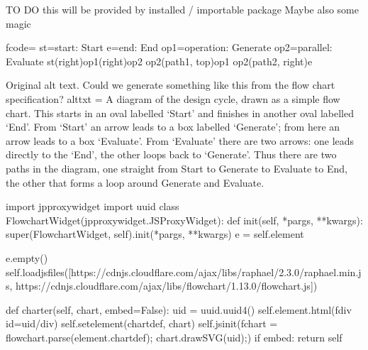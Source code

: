 \documentclass[letterpaper,10pt,english]{sphinxmanual}
\begin{document}
{{
\begin{sphinxVerbatim}[commandchars=\\\{\}]
\llap{\color{nbsphinxin}[ ]:\,\hspace{\fboxrule}\hspace{\fboxsep}}\PYGZsh{} TO DO \PYGZhy{} this will be provided by installed / importable package
\PYGZsh{} Maybe also some magic

fcode=\PYGZsq{}\PYGZsq{}\PYGZsq{}
st=\PYGZgt{}start: Start
e=\PYGZgt{}end: End
op1=\PYGZgt{}operation: Generate
op2=\PYGZgt{}parallel: Evaluate
st(right)\PYGZhy{}\PYGZgt{}op1(right)\PYGZhy{}\PYGZgt{}op2
op2(path1, top)\PYGZhy{}\PYGZgt{}op1
op2(path2, right)\PYGZhy{}\PYGZgt{}e
\PYGZsq{}\PYGZsq{}\PYGZsq{}

\PYGZsh{}Original alt text.
\PYGZsh{} Could we generate something like this from the flow chart specification?
alt\PYGZus{}txt = \PYGZdq{}\PYGZdq{}\PYGZdq{}
A diagram of the design cycle, drawn as a simple flow chart.
This starts in an oval labelled ‘Start’ and finishes in another oval labelled ‘End’.
From ‘Start’ an arrow leads to a box labelled ‘Generate’;
from here an arrow leads to a box ‘Evaluate’.
From ‘Evaluate’ there are two arrows:
one leads directly to the ‘End’, the other loops back to ‘Generate’.
Thus there are two paths in the diagram,
one straight from Start to Generate to Evaluate to End,
the other that forms a loop around Generate and Evaluate.\PYGZdq{}\PYGZdq{}\PYGZdq{}

import jp\PYGZus{}proxy\PYGZus{}widget
import uuid
class FlowchartWidget(jp\PYGZus{}proxy\PYGZus{}widget.JSProxyWidget):
    def \PYGZus{}\PYGZus{}init\PYGZus{}\PYGZus{}(self, *pargs, **kwargs):
        super(FlowchartWidget, self).\PYGZus{}\PYGZus{}init\PYGZus{}\PYGZus{}(*pargs, **kwargs)
        e = self.element

        e.empty()
        self.load\PYGZus{}js\PYGZus{}files([\PYGZdq{}https://cdnjs.cloudflare.com/ajax/libs/raphael/2.3.0/raphael.min.js\PYGZdq{},
                            \PYGZsq{}https://cdnjs.cloudflare.com/ajax/libs/flowchart/1.13.0/flowchart.js\PYGZsq{}])

    def charter(self, chart, embed=False):
        uid = uuid.uuid4()
        self.element.html(f\PYGZsq{}\PYGZlt{}div id=\PYGZdq{}\PYGZob{}uid\PYGZcb{}\PYGZdq{}\PYGZgt{}\PYGZlt{}/div\PYGZgt{}\PYGZsq{})
        self.set\PYGZus{}element(\PYGZdq{}chartdef\PYGZdq{}, chart)
        self.js\PYGZus{}init(f\PYGZdq{}chart = flowchart.parse(element.chartdef); chart.drawSVG(\PYGZsq{}\PYGZob{}uid\PYGZcb{}\PYGZsq{});\PYGZdq{})
        if embed:
            return self


\end{sphinxVerbatim}}}
\end{document}
